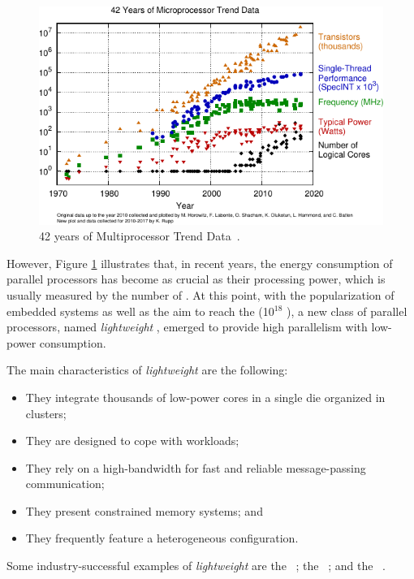 	\begin{figure}[h]
		\centering
		\includegraphics[width=.85\textwidth]{images/42-years-processor-trend.pdf}

		\caption{
			42 years of Multiprocessor Trend Data~\cite{url:microprocessor-trend-data}.
		}\par
		\label{fig.microprocessor-data}
	\end{figure}

	However, Figure \ref{fig.microprocessor-data} illustrates that, in recent years,
	the energy consumption of parallel processors has become as crucial as their
	processing power, which is usually measured by the number of \flops.
	At this point, with the popularization of embedded systems as well as the aim
	to reach the \exascale (10$^{18}$ \flops), a new class of parallel processors,
	named \textit{lightweight} \manycores, emerged to provide high parallelism
	with low-power consumption.

	The main characteristics of \textit{lightweight} \manycores are the following:
	\begin{itemize}
		\item They integrate thousands of low-power cores in a single die organized in clusters;
		\item They are designed to cope with \mimd workloads;
		\item They rely on a high-bandwidth \noc for fast and reliable message-passing communication;
		\item They present constrained memory systems; and
		\item They frequently feature a heterogeneous configuration.
	\end{itemize}
	Some industry-successful examples of \textit{lightweight} \manycores are
	the \mppa~\cite{DeDinechin2013-1};
	the \epiphany~\cite{olofsson2014}; and
	the \taihulight~\cite{zheng2015}.

